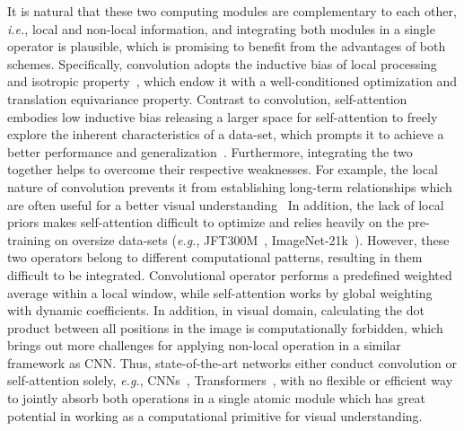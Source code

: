 \documentclass{article}
\begin{document}
It is natural that these two computing modules are complementary to each other, \emph{i.e.}, local and non-local information, and integrating both modules in a single operator is plausible, which is promising to benefit from the advantages of both schemes.
Specifically, convolution adopts the inductive bias of local processing and isotropic property~\cite{DBLP:conf/iccv/BelloZLVS19,DBLP:conf/iclr/CordonnierLJ20,DBLP:journals/corr/abs-2103-12731}, which endow it with a well-conditioned optimization and translation equivariance property.
Contrast to convolution, self-attention embodies low inductive bias releasing a larger space for self-attention to freely explore the inherent characteristics of a data-set, which prompts it to achieve a better performance and generalization~\cite{DBLP:journals/corr/abs-2012-09841,DBLP:journals/corr/abs-2103-15808}.
Furthermore, integrating the two together helps to overcome their respective weaknesses.
For example, the local nature of convolution prevents it from establishing long-term relationships which are often useful for a better visual understanding~\cite{DBLP:conf/iccv/BelloZLVS19}
In addition, the lack of local priors makes self-attention difficult to optimize and relies heavily on the pre-training on oversize data-sets (\emph{e.g.}, JFT300M~\cite{DBLP:conf/iccv/SunSSG17}, ImageNet-21k~\cite{DBLP:conf/cvpr/DengDSLL009}).
However, these two operators belong to different computational patterns, resulting in them difficult to be integrated.
Convolutional operator performs a predefined weighted average within a local window, while self-attention works by global weighting with dynamic coefficients.
In addition, in visual domain, calculating the dot product between all positions in the image is computationally forbidden, which brings out more challenges for applying non-local operation in a similar framework as CNN.
Thus, state-of-the-art networks either conduct convolution or self-attention solely, \emph{e.g.}, CNNs~\cite{DBLP:journals/corr/SimonyanZ14a,DBLP:conf/cvpr/HeZRS16,DBLP:conf/cvpr/HuangLMW17}, Transformers~\cite{DBLP:journals/corr/abs-2103-12731,DBLP:journals/corr/abs-2103-14030,DBLP:journals/corr/abs-2010-04159,DBLP:conf/eccv/CarionMSUKZ20}, with no flexible or efficient way to jointly absorb both operations in a single atomic module which has great potential in working as a computational primitive for visual understanding.
\end{document}
